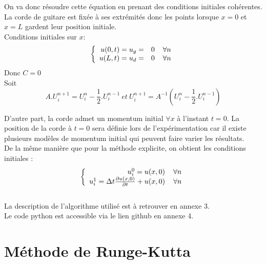 On va donc résoudre cette équation en prenant des conditions initiales cohérentes.\\
La corde de guitare est fixée à ses extrémités donc les points lorsque $x = 0$ et $x = L$ gardent leur position initiale.\\
Conditions initiales sur $x$: 
\begin{equation*}
\left \{
\begin{array}{rcl}
u(0,t) = u_{g} = &0 \hspace*{4 mm} \forall n\\
u(L,t) = u_{d} = &0 \hspace*{4 mm} \forall n\\
\end{array}
\right.
\end{equation*}
Donc $C = 0$\\
Soit
\begin{equation*}
\boxed{
A.U^{n+1}_i = U^{n}_i - \frac{1}{2}.U^{n-1}_i\:
et\:
U^{n+1}_i = A^{-1}(U^{n}_i - \frac{1}{2}.U^{n-1}_i)}
\end{equation*}



D'autre part, la corde admet un momentum initial $\forall x$ à l'instant $t=0$. La position de la corde à $t = 0$ sera définie lors de l'expérimentation car il existe plusieurs modèles de momentum initial qui peuvent faire varier les résultats.\\

De la même manière que pour la méthode explicite, on obtient les conditions initiales :
\begin{equation*}
\left \{
\begin{array}{rcl}
u^0_i = u(x,0) \hspace*{4 mm} \forall n\\
u^1_i = \Delta t \frac{\partial u(x,0)}{\partial t} + u(x,0) \hspace*{4 mm} \forall n\\
\end{array}
\right.
\end{equation*}
\\
La description de l'algorithme utilisé est à retrouver en annexe 3.\\ Le code python est accessible via le lien github en annexe 4.

\section{Méthode de Runge-Kutta}

